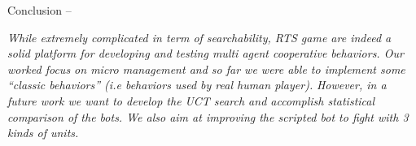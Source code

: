 \begin{bfseries} Conclusion -- \end{bfseries}
    \emph{While extremely complicated in term of searchability, RTS game are indeed a solid platform for developing and testing multi agent cooperative behaviors. Our worked focus on micro management and so far we were able to implement some ``classic behaviors'' (\emph{i.e} behaviors used by real human player).} 
    \emph{However, in a future work we want to develop the UCT search and accomplish statistical comparison of the bots. We also aim at improving the scripted bot to fight with 3 kinds of units.} 

